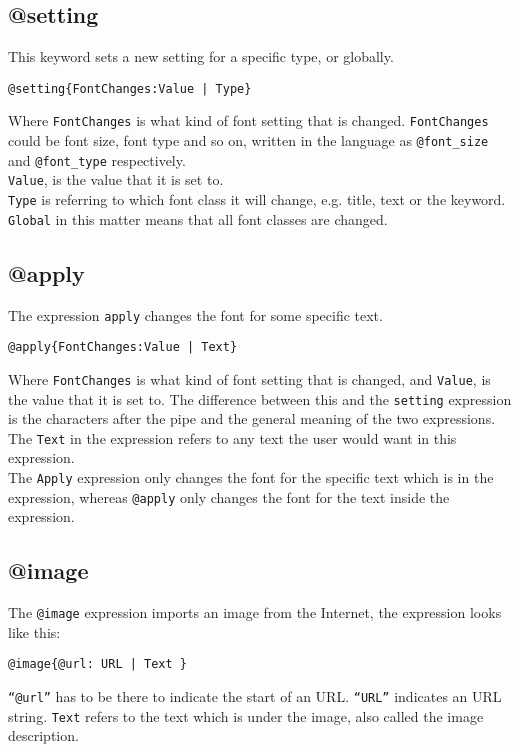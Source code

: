 \subsection{@setting}
This keyword sets a new setting for a specific type, or globally.
\begin{lstlisting}[frame=single]
@setting{FontChanges:Value | Type}
\end{lstlisting}
Where \texttt{FontChanges} is what kind of font setting that is changed. 
\texttt{FontChanges} could be font size, font type and so on, written in the language as \texttt{@font\_size} and \texttt{@font\_type} respectively. \\
\texttt{Value}, is the value that it is set to. \\
\texttt{Type} is referring to which font class it will change, e.g. title, text or the keyword. \\ %
\texttt{Global} in this matter means that all font classes are changed.

\subsection{@apply}
The expression \texttt{apply} changes the font for some specific text.
\begin{lstlisting}[frame=single]
@apply{FontChanges:Value | Text}
\end{lstlisting}
Where \texttt{FontChanges} is what kind of font setting that is changed, and \texttt{Value}, is the value that it is set to. The difference between this and the \texttt{setting} expression is the characters after the pipe and the general meaning of the two expressions. \\
The \texttt{Text} in the expression refers to any text the user would want in this expression. \\
The \texttt{Apply} expression only changes the font for the specific text which is in the expression, whereas \texttt{@apply} only changes the font for the text inside the expression.

\subsection{@image}
The \texttt{@image} expression imports an image from the Internet, the expression looks like this:
\begin{lstlisting}[frame=single]
@image{@url: URL | Text }
\end{lstlisting}
\texttt{``@url''} has to be there to indicate the start of an URL. \texttt{``URL''} indicates an URL string. \texttt{Text} refers to the text which is under the image, also called the image description.

